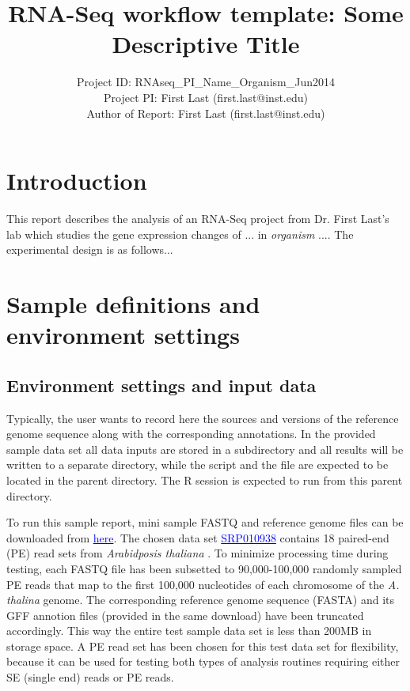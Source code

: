 \documentclass{article}\usepackage[]{graphicx}\usepackage[]{color}
\begin{document}
\title{RNA-Seq workflow template: Some Descriptive Title}
\author{Project ID: RNAseq\_PI\_Name\_Organism\_Jun2014 \\
	Project PI: First Last (first.last@inst.edu)\\
        Author of Report: First Last (first.last@inst.edu)}
\maketitle

\tableofcontents

\section{Introduction}
This report describes the analysis of an RNA-Seq project from Dr. First Last's lab which studies the gene expression changes of ... in \textit{organism} .... The experimental design is as follows...

\section{Sample definitions and environment settings}

\subsection{Environment settings and input data}
Typically, the user wants to record here the sources and versions of the reference genome sequence along with the corresponding annotations. In the provided sample data set all data inputs are stored in a  subdirectory and all results will be written to a separate  directory, while the  script and the  file are expected to be located in the parent directory. The R session is expected to run from this parent directory.

To run this sample report, mini sample FASTQ and reference genome files can be downloaded from \href{http://biocluster.ucr.edu/~tgirke/projects/systemPipeR_test_data.zip}{\textcolor{blue}{here}}. The chosen data set \href{http://www.ncbi.nlm.nih.gov/sra/?term=SRP010938}{\textcolor{blue}{SRP010938}} contains 18 paired-end (PE) read sets from \textit{Arabidposis thaliana} \citep{Howard2013-fq}. To minimize processing time during testing, each FASTQ file has been subsetted to 90,000-100,000 randomly sampled PE reads that map to the first 100,000 nucleotides of each chromosome of the \textit{A. thalina} genome. The corresponding reference genome sequence (FASTA) and its GFF annotion files (provided in the same download) have been truncated accordingly. This way the entire test sample data set is less than 200MB in storage space. A PE read set has been chosen for this test data set for flexibility, because it can be used for testing both types of analysis routines requiring either SE (single end) reads or PE reads. 
\end{document}

